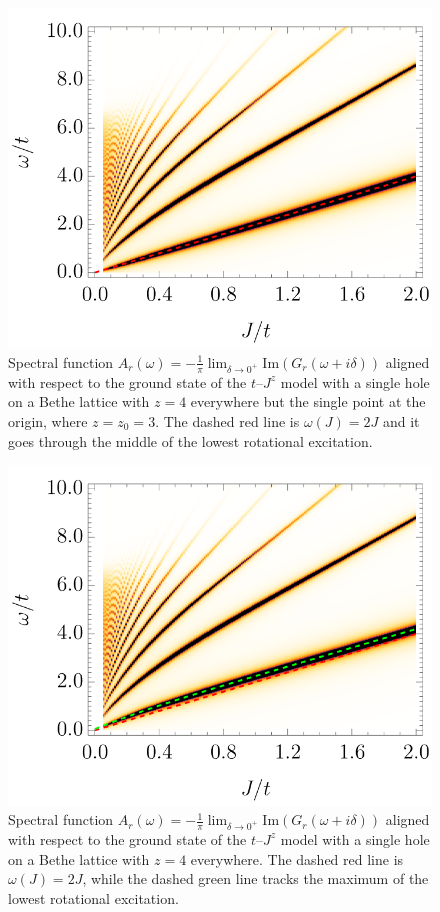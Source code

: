 \documentclass[11pt, a4paper, onecolumn]{article}
\begin{document}
\clearpage

\begin{figure}[h!]
	\includegraphics[width=0.73\columnwidth]
	{./figures/perfect_linear.png}
	\caption{
		Spectral function $A_r(\omega) = -\frac{1}{\pi}\lim_{\delta \to 0^+}\mathrm{Im}(G_r(\omega + i\delta))$ aligned with respect to the ground state of the $t$--$J^z$ model with a single hole on a Bethe lattice with $z = 4$ everywhere but the single point at the origin, where $z = z_0 = 3$. The dashed red line is $\omega(J) = 2J$ and it goes through the middle of the lowest rotational excitation.
	}\label{fig:perfect_linear}
\end{figure}

\begin{figure}[h!]
	\includegraphics[width=0.73\columnwidth]
	{./figures/linear.png}
	\caption{
		Spectral function $A_r(\omega) = -\frac{1}{\pi}\lim_{\delta \to 0^+}\mathrm{Im}(G_r(\omega + i\delta))$ aligned with respect to the ground state of the $t$--$J^z$ model with a single hole on a Bethe lattice with $z = 4$ everywhere. The dashed red line is $\omega(J) = 2J$, while the dashed green line tracks the maximum of the lowest rotational excitation.
	}\label{fig:linear}
\end{figure}
\end{document}
